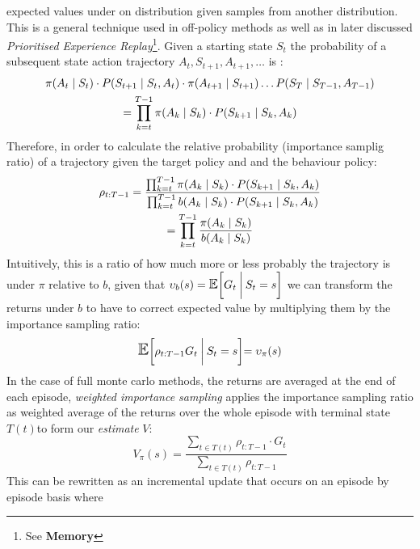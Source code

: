 expected values under on distribution given samples from another distribution. This is 
a general technique used in off-policy methods \cite{sutton2018reinforcement} as well as in later discussed \emph{Prioritised
Experience Replay}\footnote{See \textbf{Memory}}. Given a starting
state $S_t$ the probability of a subsequent state action trajectory $A_t, S_{t+1}, A_{t+1}, \hdots $ is :
\begin{equation}
    \begin{gathered}
        \pi ( A_t \mid S_t ) \cdot P( S_{t+1} \mid S_t, A_t ) \cdot \pi ( A_{t+1} \mid S_{t+1} ) \hdots P( S_T \mid S_{T-1}, A_{T-1} ) \\
        = \prod_{k=t}^{T-1}\pi( A_k \mid S_k ) \cdot P( S_{k+1} \mid S_k,A_k )
    \end{gathered}
\end{equation}
Therefore, in order to calculate the relative probability (importance samplig ratio) of a trajectory given the
target policy and and the behaviour policy:
\begin{equation}
    \begin{gathered}
        \rho_{t:T-1} = \frac{\prod_{k=t}^{T-1}\pi( A_k \mid S_k ) \cdot P( S_{k+1} \mid S_k,A_k )}{\prod_{k=t}^{T-1}b( A_k \mid S_k ) \cdot P( S_{k+1} \mid S_k,A_k )} \\
        = \prod_{k=t}^{T-1}\frac{\pi( A_k \mid S_k )}{b( A_k \mid S_k )}
    \end{gathered}
\end{equation}
Intuitively, this is a ratio of how much more or less probably the trajectory is under $\pi$ relative to $b$,
given that $\upsilon_b(s) = \E\Condition{G_t}{S_t = s}$ we can transform
the returns under $b$ to have to correct expected value by multiplying them
by the importance sampling ratio:
\begin{equation}
    \E\Condition{\rho_{t:T-1}G_t}{S_t = s} = \upsilon_\pi(s)
\end{equation}
In the case of full monte carlo methods, the returns are averaged at the end of each episode,
\emph{weighted importance sampling} applies the importance sampling ratio as weighted
average of the returns over the whole episode with terminal state $T(t)$to form our \emph{estimate} $V$:
\begin{equation}
    V_\pi(s) = \frac{\sum_{t \in T(t)} \rho_{t:T-1} \cdot G_t}{\sum_{t \in T(t)} \rho_{t:T-1}}
\end{equation}
This can be rewritten as an incremental update that occurs on an episode by episode basis where
